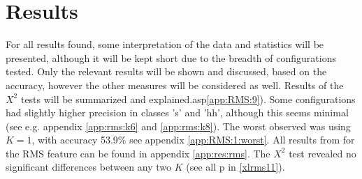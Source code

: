  
\section{Results}
	
	For all results found, some interpretation of the data and statistics will be presented, although it will be kept short due to the breadth of configurations tested. Only the relevant results will be shown and discussed, based on the accuracy, however the other measures will be considered as well. Results of the $X^2$ tests will be summarized and explained.asp\ref{app:RMS:9}). Some configurations had slightly higher precision in classes 's' and 'hh', although this seems minimal (see e.g. appendix  \ref{app:rms:k6} and \ref{app:rms:k8}). The worst observed was using $K=1$, with accuracy 53.9\% see appendix \ref{app:RMS:1:worst}. All results from for the RMS feature can be found in appendix \ref{app:res:rms}. The $X^2$ test revealed no significant differences between any two $K$ (see all p in \ref{xlrms11}).

		
	
